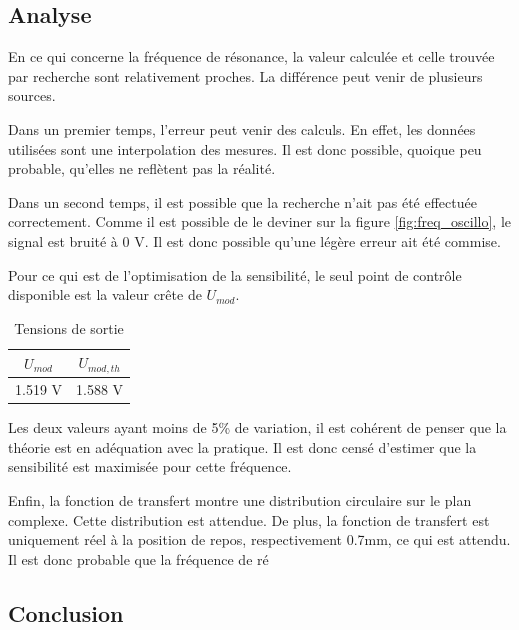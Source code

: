 \subsection{Analyse}
En ce qui concerne la fréquence de résonance, la valeur calculée et celle trouvée par recherche sont
relativement proches. La différence peut venir de plusieurs sources. 
\vspace{0,2cm}

Dans un premier temps, l'erreur
peut venir des calculs. En effet, les données utilisées sont une interpolation des mesures. Il est
donc possible, quoique peu probable, qu'elles ne reflètent pas la réalité. 
\vspace{0,2cm}

Dans un second temps, il est possible que la recherche n'ait pas été effectuée correctement. Comme
il est possible de le deviner sur la figure \ref{fig:freq_oscillo}, le signal est bruité à 0 V. Il 
est donc possible qu'une légère erreur ait été commise.
\vspace{ 0,4cm}

Pour ce qui est de l'optimisation de la sensibilité, le seul point de contrôle disponible est la 
valeur crête de $U_{mod}$.

\begin{table}[H]
    \centering
    \begin{tabular}{|c|c|}
    \hline
    $U_{mod}$     & $U_{mod,th}$  \\ \hline
    1.519 V & 1.588 V \\ \hline
    \end{tabular}
    \caption{Tensions de sortie}
    \label{tab:Umod}
\end{table} 

Les deux valeurs ayant moins de 5\% de variation, il est cohérent de penser que la théorie est en 
adéquation avec la pratique. Il est donc censé d'estimer que la sensibilité est maximisée pour cette
fréquence. 

\vspace{ 0,4cm}
Enfin, la fonction de transfert montre une distribution circulaire sur le plan complexe. 
Cette distribution est attendue. De plus, la fonction de transfert est uniquement réel à la position
de repos, respectivement 0.7mm, ce qui est attendu. Il est donc probable que la fréquence de ré

\subsection{Conclusion}
